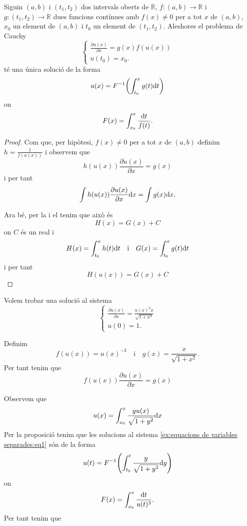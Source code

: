 \documentclass[../Apunts.tex]{subfiles}
\begin{document}
	\begin{proposition}
		\label{prop:equacions de variables separades}
		Siguin \((a,b)\) i \((t_{1},t_{2})\) dos intervals oberts de \(\mathbb{R}\), \(f\colon(a,b)\longrightarrow\mathbb{R}\) i \(g\colon(t_{1},t_{2})\longrightarrow\mathbb{R}\) dues funcions contínues amb \(f(x)\neq0\) per a tot \(x\) de \((a,b)\), \(x_{0}\) un element de \((a,b)\) i \(t_{0}\) un element de \((t_{1},t_{2})\). Aleshores el problema de Cauchy
		\begin{equation}
			\begin{cases}
				\displaystyle \frac{\partial u(x)}{\partial x}=g(x)f(u(x)) \\
				\displaystyle u(t_{0})=x_{0}.
			\end{cases}
		\end{equation}
		té una única solució de la forma
		\[u(x)=F^{-1}\left(\int_{t_{0}}^{x}g(t)\diff t\right)\]
		on
		\[F(x)=\int_{x_{0}}^{x}\frac{\textrm{d} t}{f(t)}.\]
		\begin{proof}
			Com que, per hipòtesi, \(f(x)\neq0\) per a tot \(x\) de \((a,b)\) definim \(h=\frac{1}{f(u(x))}\) i observem que
			\[h(u(x))\frac{\partial u(x)}{\partial x}=g(x)\]
			i per tant
			\[\int h(u(x))\frac{\partial u(x)}{\partial x}\textrm{d} {x}=\int g(x)\textrm{d} x.\]
			
			Ara bé, per la  i el  tenim que això és
			\[H(x)=G(x)+C\]
			on \(C\) és un real i
			\[H(x)=\int_{t_{0}}^{x}h(t)\textrm{d} t\quad\text{i}\quad G(x)=\int_{t_{0}}^{x}g(t)\textrm{d} t\]
			i per tant
			\[H(u(x))=G(x)+C\]
		\end{proof}
	\end{proposition}
	\begin{example}
		\label{ex:equacions de variables separades}
		Volem trobar una solució al sistema
		\begin{equation}
			\label{ex:equacions de variables separades:eq1}
			\begin{cases*}
				\displaystyle \frac{\partial u(x)}{\partial x}=\frac{u(x)^{3}x}{\sqrt{1+x^{2}}} \\
				u(0)=1.
			\end{cases*}
		\end{equation}
		\begin{solution}
			Definim
			\[f(u(x))=u(x)^{-3}\quad\text{i}\quad g(x)=\frac{x}{\sqrt{1+x^{2}}}.\]
			Per tant tenim que
			\[f(u(x))\frac{\partial u(x)}{\partial x}=g(x)\]
			
			Observem que
			\[u(x)=\int_{x_{0}}^{x}\frac{yu(x)}{\sqrt{1+y^{2}}}\textrm{d} x\]
			Per la proposició  tenim que les solucions al sistema \eqref{ex:equacions de variables separades:eq1} són de la forma
			\[u(t)=F^{-1}\left(\int_{t_{0}}^ {t}\frac{y}{\sqrt{1+y^{2}}}\diff y\right)\]
			on
			\[F(x)=\int_{x_{0}}^{x}\frac{\textrm{d} t}{u(t)^{3}}.\]
			Per tant tenim que
			\[\] %
		\end{solution}
	\end{example}
\end{document}
